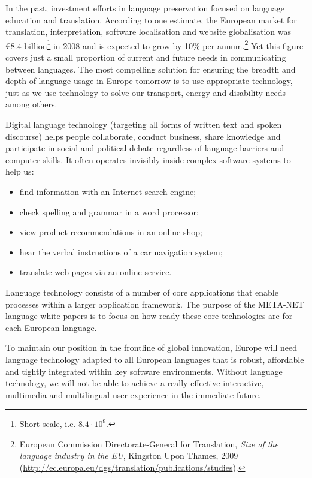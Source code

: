 In the past, investment efforts in language preservation focused on language education and translation. According to one estimate, the European market for translation, interpretation, software localisation and website globalisation was \euro8.4 billion\footnote{Short scale, i.e. $8.4\cdot 10^9$.} in 2008 and is expected to grow by 10\% per annum.\footnote{European Commission Directorate-General for Translation, \emph{Size of the language industry in the EU}, Kingston Upon Thames, 2009 (\url{http://ec.europa.eu/dgs/translation/publications/studies}).} Yet this figure covers just a small proportion of current and future needs in communicating between languages. The most compelling solution for ensuring the breadth and depth of language usage in Europe tomorrow is to use appropriate technology, just as we use technology to solve our transport, energy and disability needs among others.

Digital language technology (targeting all forms of written text and spoken discourse) helps people collaborate, conduct business, share knowledge and participate in social and political debate regardless of language barriers and computer skills. It often operates invisibly inside complex software systems to help us:

\begin{itemize}
\item find information with an Internet search engine;
\item check spelling and grammar in a word processor;
\item view product recommendations in an online shop;
\item hear the verbal instructions of a car navigation system;
\item translate web pages via an online service.
\end{itemize}

Language technology consists of a number of core applications that enable processes within a larger application framework. The purpose of the META-NET language white papers is to focus on how ready these core technologies are for each European language. 


To maintain our position in the frontline of global innovation, Europe will need language technology adapted to all European languages that is robust, affordable and tightly integrated within key software environments. Without language technology, we will not be able to achieve a really effective interactive, multimedia and multilingual user experience in the immediate future. 
